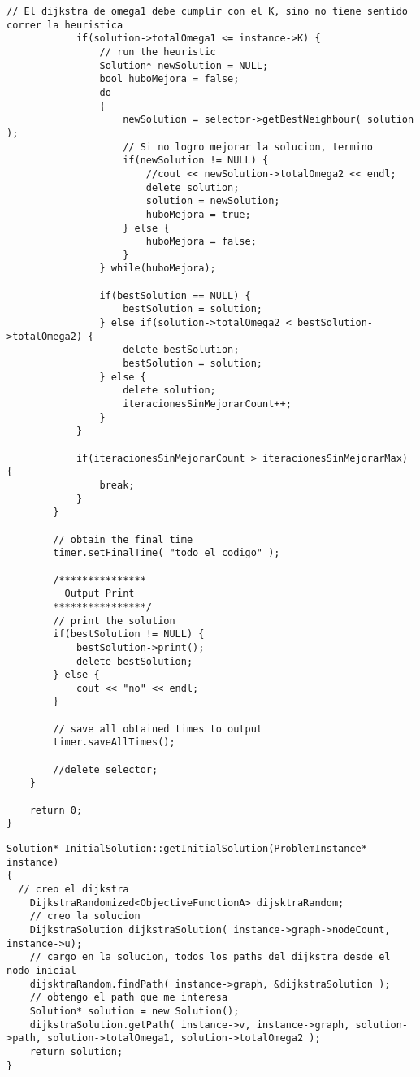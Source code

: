 \begin{lstlisting}[caption=grasp.cpp]
            // El dijkstra de omega1 debe cumplir con el K, sino no tiene sentido correr la heuristica            
            if(solution->totalOmega1 <= instance->K) {                               
                // run the heuristic
                Solution* newSolution = NULL;    
                bool huboMejora = false;
                do
                {                                        
                    newSolution = selector->getBestNeighbour( solution );                                                            
                    // Si no logro mejorar la solucion, termino      
                    if(newSolution != NULL) {                        
                        //cout << newSolution->totalOmega2 << endl; 
                        delete solution;
                        solution = newSolution;          
                        huboMejora = true;                          
                    } else {                      
                        huboMejora = false;
                    }        
                } while(huboMejora);

                if(bestSolution == NULL) {
                    bestSolution = solution;
                } else if(solution->totalOmega2 < bestSolution->totalOmega2) {
                    delete bestSolution;
                    bestSolution = solution;
                } else {
                    delete solution;
                    iteracionesSinMejorarCount++;      
                }            
            }       

            if(iteracionesSinMejorarCount > iteracionesSinMejorarMax) {      
                break;
            }
        }  

        // obtain the final time
        timer.setFinalTime( "todo_el_codigo" );

        /***************
          Output Print
        ****************/
        // print the solution
        if(bestSolution != NULL) {
            bestSolution->print();
            delete bestSolution;
        } else {
            cout << "no" << endl;
        }    
        
        // save all obtained times to output
        timer.saveAllTimes();

        //delete selector;
    }    
    
    return 0;
}
\end{lstlisting}
\begin{lstlisting}[caption=InitialSolution::getInitialSolution()]
Solution* InitialSolution::getInitialSolution(ProblemInstance* instance)
{    
  // creo el dijkstra
    DijkstraRandomized<ObjectiveFunctionA> dijsktraRandom;
    // creo la solucion
    DijkstraSolution dijkstraSolution( instance->graph->nodeCount, instance->u);
    // cargo en la solucion, todos los paths del dijkstra desde el nodo inicial
    dijsktraRandom.findPath( instance->graph, &dijkstraSolution );
    // obtengo el path que me interesa
    Solution* solution = new Solution();    
    dijkstraSolution.getPath( instance->v, instance->graph, solution->path, solution->totalOmega1, solution->totalOmega2 );
    return solution;
}
\end{lstlisting}